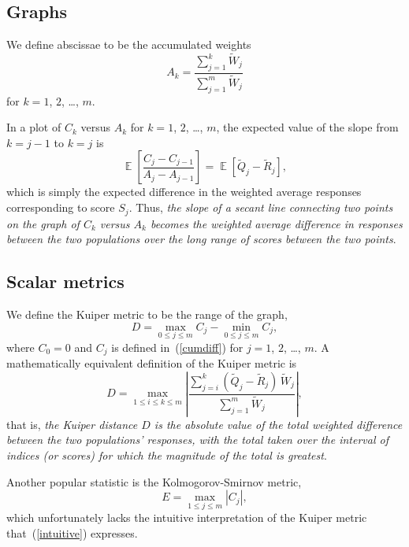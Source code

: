 \documentclass[]{fairmeta}
\DeclareMathOperator{\E}{\mathop{}\mathbb{E}}
\begin{document}
\subsection{Graphs}
\label{graphs}

We define abscissae to be the accumulated weights
%
\begin{equation}
A_k = \frac{\sum_{j=1}^k \tilde{W}_j}{\sum_{j=1}^m \tilde{W}_j}
\end{equation}
%
for $k = 1$, $2$, \dots, $m$.

In a plot of $C_k$ versus $A_k$ for $k = 1$, $2$, \dots, $m$,
the expected value of the slope from $k = j - 1$ to $k = j$ is
%
\begin{equation}
\E\left[ \frac{C_j - C_{j-1}}{A_j - A_{j-1}} \right]
= \E\left[ \tilde{Q}_j - \tilde{R}_j \right],
\end{equation}
%
which is simply the expected difference in the weighted average responses
corresponding to score $S_j$.
Thus, {\it the slope of a secant line connecting two points
on the graph of $C_k$ versus $A_k$ becomes the weighted average difference
in responses between the two populations over the long range of scores
between the two points}.


\subsection{Scalar metrics}
\label{metrics}

We define the Kuiper metric to be the range of the graph,
%
\begin{equation}
D = \max_{0 \le j \le m} C_j - \min_{0 \le j \le m} C_j,
\end{equation}
%
where $C_0 = 0$ and $C_j$ is defined in~(\ref{cumdiff})
for $j = 1$, $2$, \dots, $m$.
A mathematically equivalent definition of the Kuiper metric is
%
\begin{equation}
\label{intuitive}
D = \max_{1 \le i \le k \le m}
    \left| \frac{\sum_{j = i}^k (\tilde{Q}_j - \tilde{R}_j) \, \tilde{W}_j}
                {\sum_{j=1}^m \tilde{W}_j} \right|,
\end{equation}
%
that is, {\it the Kuiper distance $D$ is the absolute value
of the total weighted difference between the two populations' responses,
with the total taken over the interval of indices (or scores)
for which the magnitude of the total is greatest}.

Another popular statistic is the Kolmogorov-Smirnov metric,
%
\begin{equation}
E = \max_{1 \le j \le m} |C_j|,
\end{equation}
%
which unfortunately lacks the intuitive interpretation of the Kuiper metric
that~(\ref{intuitive}) expresses.
\end{document}
